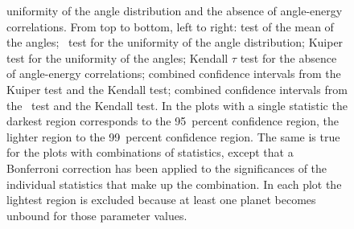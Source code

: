 \begin{figure}
{  uniformity of the angle distribution and the absence of angle-energy
  correlations. From top to bottom, left to right: test of the mean of
  the angles; \KS\ test for the uniformity of the angle distribution;
  Kuiper test for the uniformity of the angles; Kendall $\tau$ test
  for the absence of angle-energy correlations; combined confidence
  intervals from the Kuiper test and the Kendall test; combined
  confidence intervals from the \KS\ test and the Kendall test. In the
  plots with a single statistic the darkest region corresponds to the
  95~percent confidence region, the lighter region to the 99~percent
  confidence region. The same is true for the plots with combinations
  of statistics, except that a Bonferroni correction has been applied
  to the significances of the individual statistics that make up the
  combination. In each plot the lightest region is excluded because at
  least one planet becomes unbound for those parameter
  values.}\label{fig:freq}
\end{figure}


